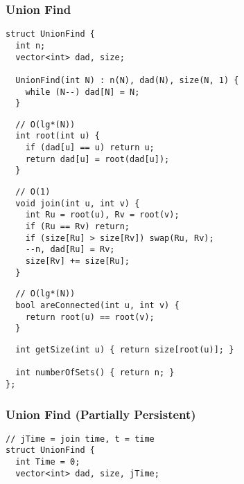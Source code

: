 \documentclass[twoside]{article}
\newcommand{\fileTitleStyle}{\large\underline}
\begin{document}
\begin{multicols*}{2}
\subsubsection*{Union Find}
\begin{verbatim}
struct UnionFind {
  int n;
  vector<int> dad, size;

  UnionFind(int N) : n(N), dad(N), size(N, 1) {
    while (N--) dad[N] = N;
  }
\end{verbatim}
\vspace{-12pt}
\begin{verbatim}
  // O(lg*(N))
  int root(int u) {
    if (dad[u] == u) return u;
    return dad[u] = root(dad[u]);
  }
\end{verbatim}
\vspace{-12pt}
\begin{verbatim}
  // O(1)
  void join(int u, int v) {
    int Ru = root(u), Rv = root(v);
    if (Ru == Rv) return;
    if (size[Ru] > size[Rv]) swap(Ru, Rv);
    --n, dad[Ru] = Rv;
    size[Rv] += size[Ru];
  }
\end{verbatim}
\vspace{-12pt}
\begin{verbatim}
  // O(lg*(N))
  bool areConnected(int u, int v) {
    return root(u) == root(v);
  }
\end{verbatim}
\vspace{-12pt}
\begin{verbatim}
  int getSize(int u) { return size[root(u)]; }

  int numberOfSets() { return n; }
};
\end{verbatim}

\subsubsectionfont{\centering\bfseries\Large}
\subsubsectionfont{\fileTitleStyle}
\subsubsection*{Union Find (Partially Persistent)}
\begin{verbatim}
// jTime = join time, t = time
struct UnionFind {
  int Time = 0;
  vector<int> dad, size, jTime;


\end{verbatim}
\end{multicols*}
\end{document}
